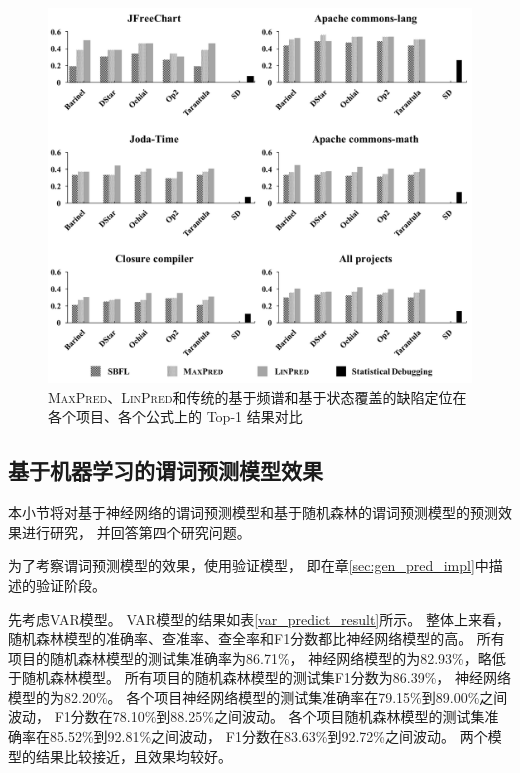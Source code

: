 \begin{figure}[htbp] 
\centering 
\includegraphics[width=15cm]{figure/all-figure-method-level} 
\caption{\textsc{MaxPred}、\textsc{LinPred}和传统的基于频谱和基于状态覆盖的缺陷定位在各个项目、各个公式上的 Top-1 结果对比} 
\label{fig:all-figure-method-level}
\end{figure}

\subsection{基于机器学习的谓词预测模型效果}

本小节将对基于神经网络的谓词预测模型和基于随机森林的谓词预测模型的预测效果进行研究，
并回答第四个研究问题。

为了考察谓词预测模型的效果，使用验证模型，
即在章\ref{sec:gen_pred_impl}中描述的验证阶段。

先考虑VAR模型。
VAR模型的结果如表\ref{var_predict_result}所示。
整体上来看，随机森林模型的准确率、查准率、查全率和F1分数都比神经网络模型的高。
所有项目的随机森林模型的测试集准确率为86.71\%，
神经网络模型的为82.93\%，略低于随机森林模型。
所有项目的随机森林模型的测试集F1分数为86.39\%，
神经网络模型的为82.20\%。
各个项目神经网络模型的测试集准确率在79.15\%到89.00\%之间波动，
F1分数在78.10\%到88.25\%之间波动。
各个项目随机森林模型的测试集准确率在85.52\%到92.81\%之间波动，
F1分数在83.63\%到92.72\%之间波动。
两个模型的结果比较接近，且效果均较好。

